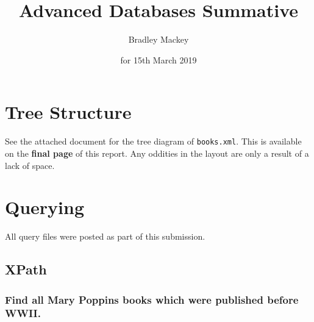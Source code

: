\documentclass[11pt]{article}
\begin{document}
\title{\textbf{Advanced Databases Summative}}
\date{for 15th March 2019}
\author{Bradley Mackey}
\maketitle

\section{Tree Structure}

See the attached document for the tree diagram of \texttt{books.xml}. This is available on the \textbf{final page} of this report. Any oddities in the layout are only a result of a lack of space.

\section{Querying}

All query files were posted as part of this submission.

\subsection{XPath}

\subsubsection{Find all Mary Poppins books which were published before WWII.}
\end{document}
